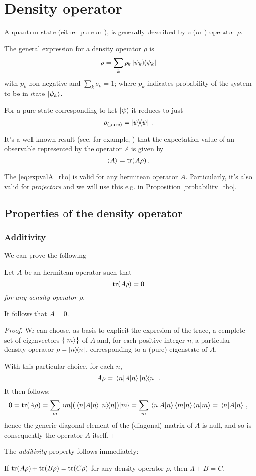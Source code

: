 \section{Density operator}\label{app:density}

A quantum state (either pure or ),
is generally described by a  (or ) operator $\rho$.

The general expression for a density operator $\rho$ is
$$
  \rho = \sum_{k}p_{k}\ketbra{\psi_{k}}
$$
with $p_{k}$ non negative and $\sum_{k}p_{k} = 1$;
where $p_k$ indicates probability of the system to be in state $\ket{\psi_{k}}$.

For a pure state corresponding to ket $\ket{\psi}$ it reduces to just
\[
  \rho_{(\text{pure})} = \ketbra{\psi}\,\text{.}
\]

It's a well known result (see, for example, \cite{open_systems})
that the expectation value of an observable represented by the operator $A$
is given by
\begin{equation}\label{eq:expvalA_rho}
  \expval{A} = \tr(A\rho)\,.
\end{equation}

The \eqref{eq:expvalA_rho} is valid for any hermitean operator $A$. Particularly,
it's also valid for \emph{projectors} and we will use this
e.g. in Proposition \ref{probability_rho}.

\subsection{Properties of the density operator}
\subsubsection{Additivity}


We can prove the following
\begin{proposition}
  Let $A$ be an hermitean operator such that
  $$
    \tr(A\rho) = 0 
  $$
  \emph{for any density operator} $\rho$.

  It follows that $A = 0$.

  \begin{proof}
    We can choose,
    as basis to explicit the expresion of the trace,
    a complete set of eigenvectors $\{\ket{m}\}$ of $A$ and,
    for each positive integer $n$,
    a particular density operator $\rho = \ketbra{n}$,
    corresponding to a (pure) eigenstate of $A$.

    With this particular choice,
    for each $n$,
    $$
      A\rho = \mel{n}{A}{n}\ketbra{n}\,.
    $$
    It then follows:
    $$
      0 = \tr(A\rho) = \sum_{m}\mel{m}{ ( \mel{n}{A}{n}\ketbra{n} ) }{m}
        = \sum_{m} \mel{n}{A}{n} \braket{m}{n} \braket{n}{m}
        = \mel{n}{A}{n}\,,
    $$
    hence the generic diagonal element of the (diagonal) matrix of $A$ is null,
    and so is consequently the operator $A$ itself.
  \end{proof}
\end{proposition}

The \emph{additivity} property follows immediately:

\begin{corollary}
If $\tr(A\rho) + \tr(B\rho) = \tr(C\rho)$ for any density operator $\rho$,
then $A + B = C$.
\end{corollary}
